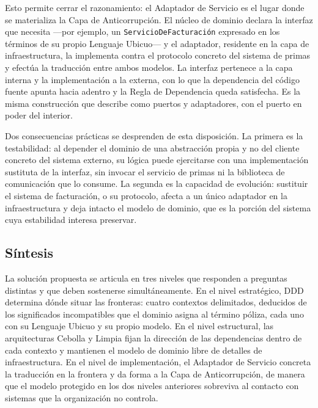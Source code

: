 Esto permite cerrar el razonamiento: el Adaptador de Servicio es el lugar donde se materializa la
Capa de Anticorrupción. El núcleo de dominio declara la interfaz que necesita ---por ejemplo, un
\texttt{ServicioDeFacturación} expresado en los términos de su propio Lenguaje Ubicuo--- y el
adaptador, residente en la capa de infraestructura, la implementa contra el protocolo concreto del
sistema de primas y efectúa la traducción entre ambos modelos. La interfaz pertenece a la capa
interna y la implementación a la externa, con lo que la dependencia del código fuente apunta hacia
adentro y la Regla de Dependencia queda satisfecha. Es la misma construcción que
\textcite{cockburn2005} describe como puertos y adaptadores, con el puerto en poder del interior.

Dos consecuencias prácticas se desprenden de esta disposición. La primera es la testabilidad: al
depender el dominio de una abstracción propia y no del cliente concreto del sistema externo, su
lógica puede ejercitarse con una implementación sustituta de la interfaz, sin invocar el servicio de
primas ni la biblioteca de comunicación que lo consume. La segunda es la capacidad de evolución:
sustituir el sistema de facturación, o su protocolo, afecta a un único adaptador en la
infraestructura y deja intacto el modelo de dominio, que es la porción del sistema cuya estabilidad
interesa preservar.

\subsection*{Síntesis}

La solución propuesta se articula en tres niveles que responden a preguntas distintas y que deben
sostenerse simultáneamente. En el nivel estratégico, DDD determina dónde situar las fronteras:
cuatro contextos delimitados, deducidos de los significados incompatibles que el dominio asigna al
término póliza, cada uno con su Lenguaje Ubicuo y su propio modelo. En el nivel estructural, las
arquitecturas Cebolla y Limpia fijan la dirección de las dependencias dentro de cada contexto y
mantienen el modelo de dominio libre de detalles de infraestructura. En el nivel de implementación,
el Adaptador de Servicio concreta la traducción en la frontera y da forma a la Capa de
Anticorrupción, de manera que el modelo protegido en los dos niveles anteriores sobreviva al
contacto con sistemas que la organización no controla.
